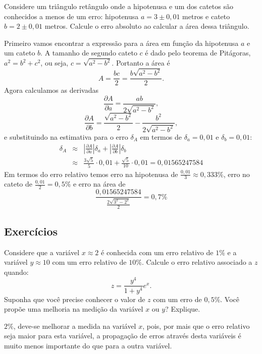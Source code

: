 \begin{ex}
Considere um triângulo retângulo onde a hipotenusa e um dos catetos são conhecidos a menos de um erro: hipotenusa $a=3\pm 0,01$ metros e cateto $b=2\pm 0,01$ metros. Calcule o erro absoluto ao calcular a área dessa triângulo.
\end{ex}
\begin{sol}
Primeiro vamos encontrar a expressão para a área em função da hipotenusa $a$ e um cateto $b$. A tamanho de segundo cateto $c$ é dado pelo teorema de Pitágoras, $a^2=b^2+c^2$, ou seja, $c=\sqrt{a^2-b^2}$. Portanto a área é
\begin{equation}
A=\frac{bc}{2}=\frac{b\sqrt{a^2-b^2}}{2}.
\end{equation}
Agora calculamos as derivadas
\begin{equation}
\frac{\partial A}{\partial a}=\frac{ab}{2\sqrt{a^2-b^2}},
\end{equation}
\begin{equation}
\frac{\partial A}{\partial b}=\frac{\sqrt{a^2-b^2}}{2}-\frac{b^2}{2\sqrt{a^2-b^2}},
\end{equation}
e substituindo na estimativa para o erro $\delta_A$ em termos de $\delta_a=0,01$ e $\delta_b=0,01$:
\begin{eqnarray}
\delta_A&\approx & \left|\frac{\partial A}{\partial a}\right|\delta_a+\left|\frac{\partial A}{\partial b}\right|\delta_b\\
&\approx &\frac{3\sqrt{5}}{5}\cdot 0,01+\frac{\sqrt{5}}{10}\cdot 0,01=0,01565247584
\end{eqnarray}
Em termos do erro relativo temos erro na hipotenusa de $\frac{0,01}{3}\approx 0,333\%$, erro no cateto de $\frac{0,01}{2}= 0,5\%$ e erro na área de
\begin{equation}
\frac{0,01565247584}{\frac{2\sqrt{3^2-2^2}}{2}}=0,7\%
\end{equation}
\end{sol}

\subsection*{Exercícios}

\begin{exer}Considere que a variável $x\approx 2$ é conhecida com um erro relativo de $1\%$ e a variável $y\approx 10$ com um erro relativo de $10\%$. Calcule o erro relativo associado a $z$ quando:
  \begin{equation}
    z=\frac{y^4}{1+y^4}e^x.
  \end{equation}
Suponha que você precise conhecer o valor de $z$ com um erro de $0,5\%$. Você propõe uma melhoria na medição da variável $x$ ou $y$? Explique.
\end{exer}
\begin{resp}
    $2\%$, deve-se melhorar a medida na variável $x$, pois, por mais que o erro relativo seja maior para esta variável, a propagação de erros através desta variáveis é muito menos importante do que para a outra variável.
\end{resp}

